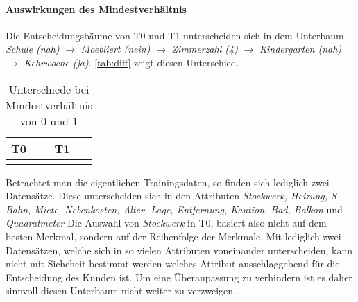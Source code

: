 \paragraph{Auswirkungen des Mindestverhältnis}
Die Entscheidungsbäume von T0 und T1 unterscheiden sich in dem Unterbaum
\emph{Schule (nah)} $\rightarrow$ \emph{Moebliert (nein)} $\rightarrow$ \emph{Zimmerzahl (4)} $\rightarrow$ \emph{Kindergarten (nah)} $\rightarrow$ \emph{Kehrwoche (ja)}.
\autoref{tab:diff} zeigt diesen Unterschied.

\useunder{\uline}{\ul}{}
\begin{table}[h]
    \begin{center}
        \begin{tabular}{|p{6cm}|p{6cm}|}
        \hline
            {\ul \textbf{T0}}   & {\ul \textbf{T1}} \\
            \hline
            {}
            &
            {}
            \\
            \hline
        \end{tabular}
        \caption{Unterschiede bei Mindestverhältnis von $0$ und $1$}
        \label{tab:diff}
    \end{center}
\end{table}

Betrachtet man die eigentlichen Trainingsdaten, so finden sich lediglich zwei Datensätze.
Diese unterscheiden sich in den Attributen \emph{Stockwerk, Heizung, S-Bahn, Miete, Nebenkosten, Alter, Lage, Entfernung, Kaution, Bad, Balkon} und \emph{Quadratmeter}
Die Auswahl von \emph{Stockwerk} in T0, basiert also nicht auf dem besten Merkmal,
 sondern auf der Reihenfolge der Merkmale.
Mit lediglich zwei Datensätzen, welche sich in so vielen Attributen voneinander unterscheiden,
kann nicht mit Sicheheit bestimmt werden welches Attribut ausschlaggebend für die Entscheidung des Kunden ist.
Um eine Überanpassung zu verhindern ist es daher sinnvoll diesen Unterbaum nicht weiter zu verzweigen.

